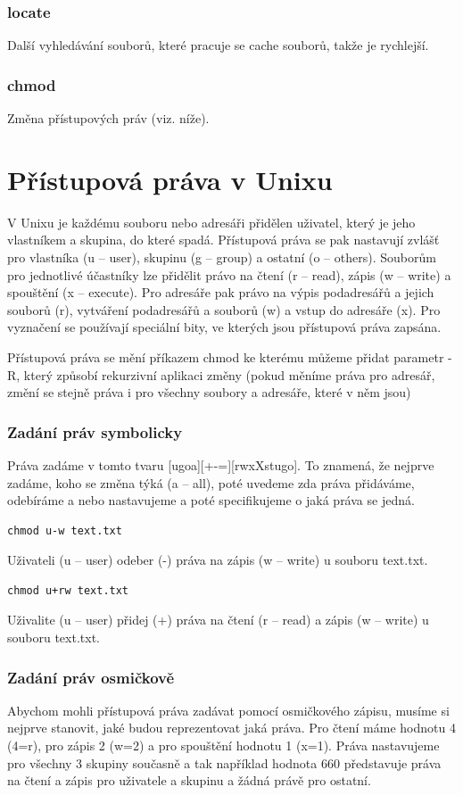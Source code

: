 \documentclass{article}
\begin{document}
\subsubsection{locate}
Další vyhledávání souborů, které pracuje se cache souborů, takže je rychlejší.

\subsubsection{chmod}
Změna přístupových práv (viz. níže).

\section{Přístupová práva v Unixu}
V Unixu je každému souboru nebo adresáři přidělen uživatel, který je jeho vlastníkem a skupina, do které spadá. Přístupová práva se pak nastavují zvlášť pro vlastníka (u -- user), skupinu (g -- group) a ostatní (o -- others). Souborům pro jednotlivé účastníky lze přidělit právo na čtení (r -- read), zápis (w -- write) a spouštění (x -- execute). Pro adresáře pak právo na výpis podadresářů a jejich souborů (r), vytváření podadresářů a souborů (w) a vstup do adresáře (x). Pro vyznačení se používají speciální bity, ve kterých jsou přístupová práva zapsána. 

Přístupová práva se mění příkazem chmod ke kterému můžeme přidat parametr -R, který způsobí rekurzivní aplikaci změny (pokud měníme práva pro adresář, změní se stejně práva i pro všechny soubory a adresáře, které v něm jsou)
\subsubsection{Zadání práv symbolicky}
Práva zadáme v tomto tvaru [ugoa][+-=][rwxXstugo]. To znamená, že nejprve zadáme, koho se změna týká (a -- all), poté uvedeme zda práva přidáváme, odebíráme a nebo nastavujeme a poté specifikujeme o jaká práva se jedná.
\begin{verbatim}
chmod u-w text.txt
\end{verbatim}
Uživateli (u -- user) odeber (-) práva na zápis (w -- write) u souboru text.txt.

\begin{verbatim}
chmod u+rw text.txt
\end{verbatim}
Uživalite (u -- user) přidej (+) práva na čtení (r -- read) a zápis (w -- write) u souboru text.txt.

\subsubsection{Zadání práv osmičkově}
Abychom mohli přístupová práva zadávat pomocí osmičkového zápisu, musíme si nejprve stanovit, jaké  budou reprezentovat jaká práva. Pro čtení máme hodnotu 4 (4=r), pro zápis 2 (w=2) a pro spouštění hodnotu 1 (x=1). Práva nastavujeme pro všechny 3 skupiny současně a tak například hodnota 660 představuje práva na čtení a zápis pro uživatele a skupinu a žádná právě pro ostatní.
\end{document}
